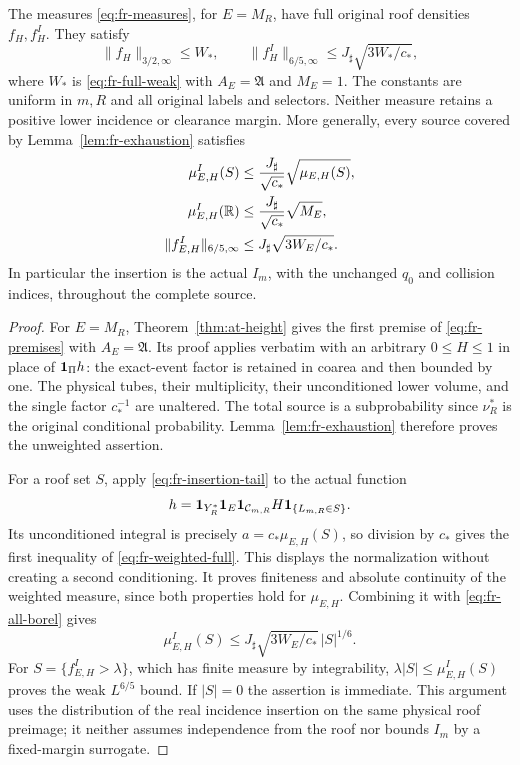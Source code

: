 \begin{theorem}
\label{thm:fr-full-source}
The measures \eqref{eq:fr-measures}, for $E=M_R$, have full original
roof densities $f_H,f_H^I$.  They satisfy
\begin{equation}\label{eq:fr-full-source}
 \|f_H\|_{3/2,\infty}\le W_* ,\qquad
 \|f_H^I\|_{6/5,\infty}
                  \le J_\sharp\sqrt{3W_*/c_*},
\end{equation}
where $W_*$ is \eqref{eq:fr-full-weak} with
$A_E=\mathfrak A$ and $M_E=1$.
The constants are uniform in $m,R$ and all original labels and
selectors.  Neither measure retains a positive lower incidence or
clearance margin.  More generally, every source covered by
Lemma~\ref{lem:fr-exhaustion} satisfies
\begin{align}\label{eq:fr-weighted-full}
 \mu^I_{E,H}(S)&\le\frac{J_\sharp}{\sqrt{c_*}}
                           \sqrt{\mu_{E,H}(S)},\notag\\
 \mu^I_{E,H}(\mathbb R)&\le\frac{J_\sharp}{\sqrt{c_*}}\sqrt{M_E},\notag\\
 \|f^I_{E,H}\|_{6/5,\infty}
                  &\le J_\sharp\sqrt{3W_E/c_*}.
\end{align}
In particular the insertion is the actual $I_m$, with the unchanged
$q_0$ and collision indices, throughout the complete source.
\end{theorem}
\begin{proof}
For $E=M_R$, Theorem~\ref{thm:at-height} gives the first premise of
\eqref{eq:fr-premises} with $A_E=\mathfrak A$.
Its proof applies verbatim with an arbitrary $0\le H\le1$ in place
of $\mathbf1_\Pi h$: the exact-event factor is retained in coarea and
then bounded by one.  The physical tubes, their multiplicity, their
unconditioned lower volume, and the single factor $c_*^{-1}$ are
unaltered.  The total source is a subprobability since $\nu_R^*$
is the original conditional probability.  Lemma~\ref{lem:fr-exhaustion}
therefore proves the unweighted assertion.

For a roof set $S$, apply \eqref{eq:fr-insertion-tail} to the actual
function
\[
 h=\mathbf1_{Y_R^*}\mathbf1_E\mathbf1_{\mathcal C_{m,R}}H
                    \mathbf1_{\{L_{m,R}\in S\}}.
\]
Its unconditioned integral is precisely
$a=c_*\mu_{E,H}(S)$, so division by $c_*$ gives the first inequality
of \eqref{eq:fr-weighted-full}.  This displays the normalization
without creating a second conditioning.  It proves finiteness and
absolute continuity of the weighted measure, since both properties
hold for $\mu_{E,H}$.
Combining it with \eqref{eq:fr-all-borel} gives
\[
 \mu^I_{E,H}(S)
    \le J_\sharp\sqrt{3W_E/c_*}\,|S|^{1/6}.
\]
For $S=\{f^I_{E,H}>\lambda\}$, which has finite measure by
integrability, $\lambda|S|\le\mu^I_{E,H}(S)$ proves the weak
$L^{6/5}$ bound.  If $|S|=0$ the assertion is immediate.
This argument uses the distribution of the real incidence insertion
on the same physical roof preimage; it neither assumes independence
from the roof nor bounds $I_m$ by a fixed-margin surrogate.
\end{proof}

